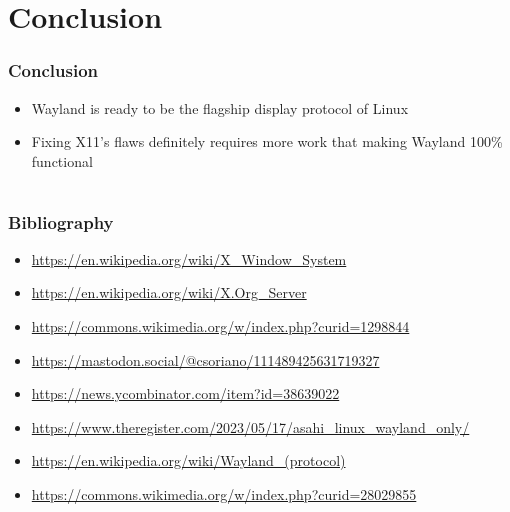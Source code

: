 \documentclass{beamer}
\begin{document}
\section{Conclusion}
\begin{frame}
  \frametitle{Conclusion}
  \begin{itemize}
    \item Wayland is ready to be the flagship display protocol of Linux
    \item Fixing X11's flaws definitely requires more work that making Wayland 100\% functional
  \end{itemize}
\end{frame}

\section*{}
\begin{frame}
  \frametitle{Bibliography}
  \footnotesize
  \begin{itemize}
    \item \url{https://en.wikipedia.org/wiki/X_Window_System}
    \item \url{https://en.wikipedia.org/wiki/X.Org_Server}
    \item \url{https://commons.wikimedia.org/w/index.php?curid=1298844}
    \item \url{https://mastodon.social/@csoriano/111489425631719327}
    \item \url{https://news.ycombinator.com/item?id=38639022}
    \item \url{https://www.theregister.com/2023/05/17/asahi_linux_wayland_only/}
    \item \url{https://en.wikipedia.org/wiki/Wayland_(protocol)}
    \item \url{https://commons.wikimedia.org/w/index.php?curid=28029855}
  \end{itemize}
\end{frame}
\end{document}
